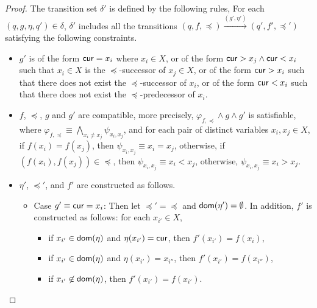 \begin{appendix}
{\begin{proof}
The transition set $\delta'$ is defined by the following rules, 
For each $(q, g, \eta, q') \in \delta$, $\delta'$ includes all the transitions $(q, f, \preceq) \xrightarrow{(g', \eta')} (q', f', \preceq')$ satisfying the following constraints. 
\begin{itemize}
\item  $g'$ is of the form $\mathsf{cur} = x_i$ where $x_i \in X$, or of the form $\mathsf{cur} > x_j \wedge \mathsf{cur} < x_i$ such that $x_i \in X$ is the $\preceq$-successor of $x_j \in X$, or of the form $\mathsf{cur} > x_i$ such that there does not exist the $\preceq$-successor of $x_i$, or of the form $\mathsf{cur} < x_i$ such that there does not exist the $\preceq$-predecessor of $x_i$.
%
\item $f$, $\preceq$, $g$ and $g'$ are compatible, more precisely, $\varphi_{f, \preceq} \wedge g \wedge g'$ is satisfiable, where $\varphi_{f, \preceq} \equiv \bigwedge \limits_{x_i \neq x_j} \psi_{x_i, x_j}$, and for each pair of distinct variables $x_i, x_j \in X$,  if $f(x_i) = f(x_j)$, then $\psi_{x_i, x_j} \equiv x_i = x_j$, otherwise, if $(f(x_i), f(x_j)) \in \preceq$, then $\psi_{x_i, x_j} \equiv x_i < x_j$, otherwise, $\psi_{x_i, x_j} \equiv x_i > x_j$. 

%
%
%
%
\item $\eta'$, $\preceq'$, and $f'$ are constructed as follows.
\begin{itemize}
\item Case $g' \equiv \mathsf{cur} = x_i$: Then let $\preceq' = \preceq$ and $\mathsf{dom}(\eta')=\emptyset$. In addition, $f'$ is constructed as follows:
for each $x_{i'} \in X$, 
\begin{itemize}
\item if $x_{i'} \in \mathsf{dom}(\eta)$ and $\eta(x_{i'}) = \mathsf{cur}$, then $f'(x_{i'}) = f(x_i)$, 
%
\item if $x_{i'} \in \mathsf{dom}(\eta)$ and $\eta(x_{i'}) = x_{i''}$, then $f'(x_{i'})=f(x_{i''})$,
%
\item if $x_{i'} \not \in \mathsf{dom}(\eta)$, then $f'(x_{i'})=f(x_{i'})$.
\end{itemize}


\end{itemize}
\end{itemize}
\end{proof}}
\end{appendix}

